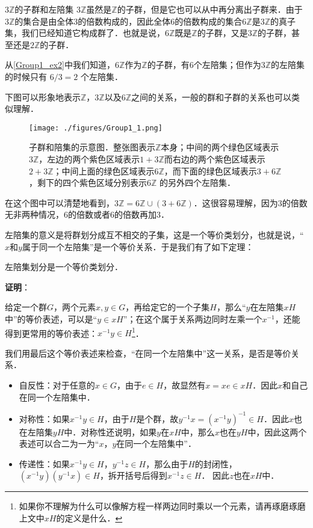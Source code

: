\begin{example}{$3\mathbb{Z}$的子群和左陪集}\label{Group1_ex3}
$3\mathbb{Z}$虽然是$\mathbb{Z}$的子群，但是它也可以从中再分离出子群来．由于$3\mathbb{Z}$的集合是由全体$3$的倍数构成的，因此全体$6$的倍数构成的集合$6\mathbb{Z}$是$3\mathbb{Z}$的真子集，我们已经知道它构成群了．也就是说，$6\mathbb{Z}$既是$\mathbb{Z}$的子群，又是$3\mathbb{Z}$的子群，甚至还是$2\mathbb{Z}$的子群．

从\autoref{Group1_ex2}中我们知道，$6\mathbb{Z}$作为$\mathbb{Z}$的子群，有$6$个左陪集；但作为$3\mathbb{Z}$的左陪集的时候只有 $6/3=2$ 个左陪集．

下图可以形象地表示$\mathbb{Z}$，$3\mathbb{Z}$以及$6\mathbb{Z}$之间的关系，一般的群和子群的关系也可以类似理解．

\begin{figure}[ht]
\centering
\texttt{[image: ./figures/Group1\_1.png]}
\caption{子群和陪集的示意图．整张图表示$\mathbb{Z}$本身；中间的两个绿色区域表示$3\mathbb{Z}$，左边的两个紫色区域表示$1+3\mathbb{Z}$而右边的两个紫色区域表示$2+3\mathbb{Z}$；中间上面的绿色区域表示$6\mathbb{Z}$，而下面的绿色区域表示$3+6\mathbb{Z}$，剩下的四个紫色区域分别表示$6\mathbb{Z}$ 的另外四个左陪集．} \label{Group1_fig1}
\end{figure}

在这个图中可以清楚地看到，$3\mathbb{Z}=6\mathbb{Z}\cup(3+6\mathbb{Z})$．这很容易理解，因为$3$的倍数无非两种情况，$6$的倍数或者$6$的倍数再加$3$．

\end{example}

左陪集的意义是将群划分成互不相交的子集，这是一个等价类划分，也就是说，“$x$和$y$属于同一个左陪集”是一个等价关系．于是我们有了如下定理： 

\begin{theorem}{}\label{Group1_the1}

左陪集划分是一个等价类划分．

\end{theorem}

\textbf{证明}：

给定一个群$G$，两个元素$x, y\in G$，再给定它的一个子集$H$，那么“$y$在左陪集$xH$中”的等价表述，可以是“$y\in xH$”；在这个属于关系两边同时左乘一个$x^{-1}$，还能得到更常用的等价表述：$x^{-1}y\in H$\footnote{如果你不理解为什么可以像解方程一样两边同时乘以一个元素，请再琢磨琢磨上文中$xH$的定义是什么．}．

我们用最后这个等价表述来检查，“在同一个左陪集中”这一关系，是否是等价关系．
\begin{itemize}
\item 自反性：对于任意的$x\in G$，由于$e\in H$，故显然有$x=xe\in xH$．因此$x$和自己在同一个左陪集中．
\item 对称性：如果$x^{-1}y\in H$，由于$H$是个群，故$y^{-1}x=(x^{-1}y)^{-1}\in H$．因此$x$也在左陪集$yH$中．对称性还说明，如果$y$在$xH$中，那么$x$也在$yH$中，因此这两个表述可以合二为一为“$x$，$y$在同一个左陪集中”．
\item 传递性：如果$x^{-1}y\in H$，$y^{-1}z\in H$，那么由于$H$的封闭性，$(x^{-1}y)(y^{-1}x)\in H$，拆开括号后得到$x^{-1}z\in H$． 因此$z$也在$xH$中．
\end{itemize}

